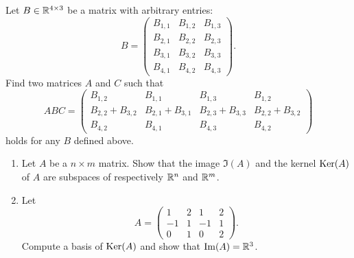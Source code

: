 \documentclass[11pt,nocut]{article}
\begin{document}
\begin{problem}[2 points]
	Let $B \in \mathbb{R}^{4 \times 3}$ be a matrix with arbitrary entries:
	$$
	B = 
	\begin{pmatrix}
		B_{1,1} & B_{1,2} & B_{1,3}\\
		B_{2,1} & B_{2,2} & B_{2,3}\\
		B_{3,1} & B_{3,2} & B_{3,3}\\
		B_{4,1} & B_{4,2} & B_{4,3}
	\end{pmatrix}.
	$$
	Find two matrices $A$ and $C$ such that
	$$
	A B C = 
	\begin{pmatrix}
		B_{1,2} & B_{1,1} & B_{1,3} & B_{1,2} \\
		B_{2,2} + B_{3,2} & B_{2,1} + B_{3,1} & B_{2,3} + B_{3,3} & B_{2,2} + B_{3,2} \\
		B_{4,2} & B_{4,1} & B_{4,3} & B_{4,2}
	\end{pmatrix}
	$$
	holds for any $B$ defined above.
\end{problem}
\vspace{5mm}

\begin{problem}[3 points]\leavevmode
	\begin{enumerate}[label=\normalfont(\textbf{\alph*})]
		\item Let $A$ be a $n \times m$ matrix. Show that the image $\Im(A)$ and the kernel ${{\rm Ker}}(A)$ of $A$ are subspaces of respectively $\mathbb{R}^n$ and $\mathbb{R}^m$.
		\item Let
			$$
			A = 
			\begin{pmatrix}
				1 & 2 & 1 & 2 \\
				-1 & 1 & -1 & 1 \\
				0 & 1 & 0 & 2 
			\end{pmatrix}.
			$$
			Compute a basis of ${{\rm Ker}}(A)$ and show that ${{\rm Im}}(A) = \mathbb{R}^3$.
	\end{enumerate}
\end{problem}
\end{document}
